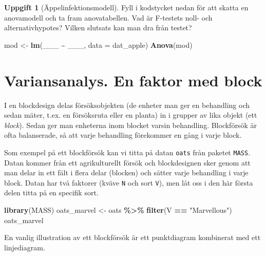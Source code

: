 \documentclass[
]{book}
\newenvironment{Shaded}{\begin{snugshade}}{\end{snugshade}}
\newcommand{\AttributeTok}[1]{\textcolor[rgb]{0.13,0.29,0.53}{#1}}
\newcommand{\FunctionTok}[1]{\textcolor[rgb]{0.13,0.29,0.53}{\textbf{#1}}}
\newcommand{\NormalTok}[1]{#1}
\newcommand{\OtherTok}[1]{\textcolor[rgb]{0.56,0.35,0.01}{#1}}
\newcommand{\SpecialCharTok}[1]{\textcolor[rgb]{0.81,0.36,0.00}{\textbf{#1}}}
\newcommand{\StringTok}[1]{\textcolor[rgb]{0.31,0.60,0.02}{#1}}
\theoremstyle{definition}
\theoremstyle{definition}
\theoremstyle{definition}
\newtheorem{exercise}{Uppgift}[chapter]
\theoremstyle{definition}
\theoremstyle{remark}
\begin{document}
\begin{exercise}[Äppelinfektionsmodell]

Fyll i kodstycket nedan för att skatta en anovamodell och ta fram anovatabellen. Vad är F-testets noll- och alternativhypotes? Vilken slutsats kan man dra från testet?

\begin{Shaded}
\begin{Highlighting}[]
\NormalTok{mod }\OtherTok{\textless{}{-}} \FunctionTok{lm}\NormalTok{(\_\_\_ }\SpecialCharTok{\textasciitilde{}}\NormalTok{ \_\_\_, }\AttributeTok{data =}\NormalTok{ dat\_apple)}
\FunctionTok{Anova}\NormalTok{(mod)}
\end{Highlighting}
\end{Shaded}

\end{exercise}

\section{Variansanalys. En faktor med block}\label{variansanalys.-en-faktor-med-block}

I en blockdesign delas försöksobjekten (de enheter man ger en behandling och sedan mäter, t.ex. en försöksruta eller en planta) in i grupper av lika objekt (ett \emph{block}). Sedan ger man enheterna inom blocket varsin behandling. Blockförsök är ofta balanserade, så att varje behandling förekommer en gång i varje block.

Som exempel på ett blockförsök kan vi titta på datan \texttt{oats} från paketet \texttt{MASS}. Datan kommer från ett agrikulturellt försök och blockdesignen sker genom att man delar in ett fält i flera delar (blocken) och sätter varje behandling i varje block. Datan har två faktorer (kväve \texttt{N} och sort \texttt{V}), men låt oss i den här första delen titta på en specifik sort.

\begin{Shaded}
\begin{Highlighting}[]
\FunctionTok{library}\NormalTok{(MASS)}
\NormalTok{oats\_marvel }\OtherTok{\textless{}{-}}\NormalTok{ oats }\SpecialCharTok{\%\textgreater{}\%} \FunctionTok{filter}\NormalTok{(V }\SpecialCharTok{==} \StringTok{"Marvellous"}\NormalTok{)}
\NormalTok{oats\_marvel}
\end{Highlighting}
\end{Shaded}

En vanlig illustration av ett blockförsök är ett punktdiagram kombinerat med ett linjediagram.
\end{document}
